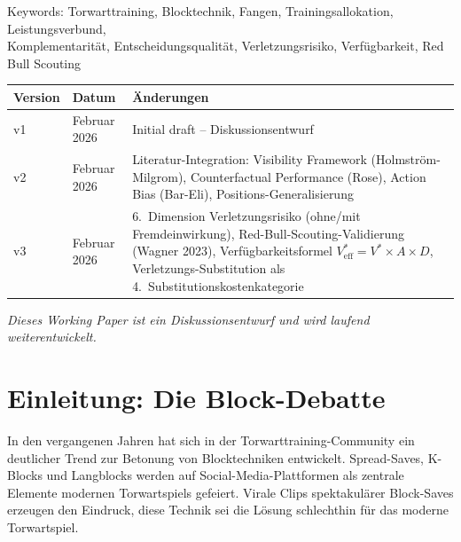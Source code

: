 \documentclass[12pt,a4paper]{article}
\begin{document}
\begin{titlepage}
\begin{center}
\vspace{0.8cm}

{\footnotesize
Keywords: Torwarttraining, Blocktechnik, Fangen, Trainingsallokation, Leistungsverbund,\\
Komplementarit\"at, Entscheidungsqualit\"at, Verletzungsrisiko, Verf\"ugbarkeit, Red Bull Scouting
}

\end{center}
\end{titlepage}

\begin{tcolorbox}[colback=gray!5!white, colframe=gray!50!black,
    title=\textbf{Version History}]
\begin{tabular}{@{}llp{8cm}@{}}
\toprule
\textbf{Version} & \textbf{Datum} & \textbf{\"Anderungen} \\
\midrule
v1 & Februar 2026 & Initial draft -- Diskussionsentwurf \\
v2 & Februar 2026 & Literatur-Integration: Visibility Framework (Holmstr\"om-Milgrom), Counterfactual Performance (Rose), Action Bias (Bar-Eli), Positions-Generalisierung \\
v3 & Februar 2026 & 6.\ Dimension Verletzungsrisiko (ohne/mit Fremdeinwirkung), Red-Bull-Scouting-Validierung (Wagner 2023), Verf\"ugbarkeitsformel $V^{*}_{\text{eff}} = V^{*} \times A \times D$, Verletzungs-Substitution als 4.\ Substitutionskostenkategorie \\
\bottomrule
\end{tabular}
\end{tcolorbox}

\vspace{0.5cm}
{\small\textit{Dieses Working Paper ist ein Diskussionsentwurf und wird laufend weiterentwickelt.}}

\tableofcontents
\newpage

\section{Einleitung: Die Block-Debatte}
\label{sec:einleitung}

In den vergangenen Jahren hat sich in der Torwarttraining-Community ein deutlicher Trend zur Betonung von Blocktechniken entwickelt. Spread-Saves, K-Blocks und Langblocks werden auf Social-Media-Plattformen als zentrale Elemente modernen Torwartspiels gefeiert. Virale Clips spektakul\"arer Block-Saves erzeugen den Eindruck, diese Technik sei die L\"osung schlechthin f\"ur das moderne Torwartspiel.
\end{document}
